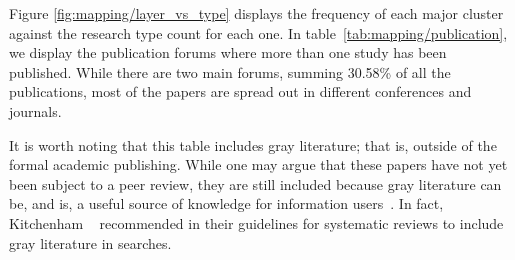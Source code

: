 Figure \ref{fig:mapping/layer_vs_type} displays the frequency of each major cluster
against the research type count for each one. In table~\ref{tab:mapping/publication},
we display the publication forums where more than one study has been published.
While there are two main forums, summing 30.58\% of all the publications,
most of the papers are spread out in different conferences and journals.

It is worth noting that this table includes gray literature; that is, outside of the
formal academic publishing.
While one may argue that these papers have not yet been subject to a peer
review, they are still included because gray literature can be, and is, a useful
source of knowledge for information users~\cite{Lawrence2015}. In fact,
Kitchenham \etal~\cite{Kitchenham2007} recommended in their guidelines for systematic
reviews to include gray literature in searches.

